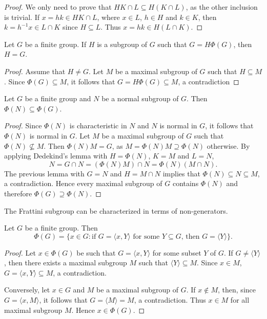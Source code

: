 \begin{proof}
	We only need to prove that $HK\cap L\subseteq H(K\cap L)$, 
	as the other inclusion is trivial. If 
	$x=hk\in HK\cap L$, where $x\in L$, $h\in H$ and $k\in K$,
	then $k=h^{-1}x\in L\cap K$ since $H\subseteq L$. Thus $x=hk\in H(L\cap
	K)$.
\end{proof}

\begin{lemma}
	\label{lem:G=HPhi(G)}
	Let $G$ be a finite group. If $H$ is a subgroup of $G$ such that $G=H\Phi(G)$,
	then $H=G$.
\end{lemma}

\begin{proof}
	Assume that $H\ne G$. Let $M$ be a maximal subgroup of $G$ such that
	$H\subseteq M$. Since $\Phi(G)\subseteq M$, it follows that $G=H\Phi(G)\subseteq M$, a contradiction
\end{proof}

\begin{proposition}
	\label{pro:phi(N)phi(G)}
	Let $G$ be a finite group and $N$ be a normal subgroup of $G$. Then $\Phi(N)\subseteq\Phi(G)$.
\end{proposition}

\begin{proof}
	Since $\Phi(N)$ is characteristic in $N$ and $N$ is normal in $G$, it follows that 
	$\Phi(N)$
	is normal in $G$.  Let $M$ be a maximal subgroup of $G$ such that 
	$\Phi(N)\not\subseteq M$.  Then $\Phi(N)M=G$, as 
	$M=\Phi(N)M\supseteq\Phi(N)$ otherwise. By applying Dedekind's lemma with 
	$H=\Phi(N)$, $K=M$ and $L=N$,   
	\[
		N=G\cap N=(\Phi(N)M)\cap N=\Phi(N)(M\cap N).
	\]
	The previous lemma with $G=N$ and $H=M\cap N$ implies that $\Phi(N)\subseteq
	N\subseteq M$, a contradiction. Hence every maximal subgroup of $G$ 
	contains $\Phi(N)$ and therefore $\Phi(G)\supseteq\Phi(N)$. 
\end{proof}

The Frattini subgroup can be characterized in terms of non-generators.  

\begin{lemma}
	\label{lemma:nongenerators}
	Let $G$ be a finite group. Then 
	\[
	\Phi(G)=\{x\in G:\text{if $G=\langle x,Y\rangle$ for some $Y\subseteq G$, then $G=\langle Y\rangle$}\}.
	\]
\end{lemma}

\begin{proof}
	Let $x\in\Phi(G)$ be such that $G=\langle
	x,Y\rangle$ for some subset $Y$ of $G$. If $G\ne \langle Y\rangle$, then 
	there exists a maximal subgroup $M$ such that $\langle Y\rangle\subseteq M$. Since 
	$x\in M$, $G=\langle x,Y\rangle\subseteq M$, a contradiction.
	
	Conversely, 
	let $x\in G$ and $M$ be a maximal subgroup of $G$. If $x\not\in M$, then, since $G=\langle
	x,M\rangle$, it follows that $G=\langle M\rangle=M$, a contradiction. Thus $x\in M$ for all
	maximal subgroup $M$. Hence $x\in \Phi(G)$. 
\end{proof}

